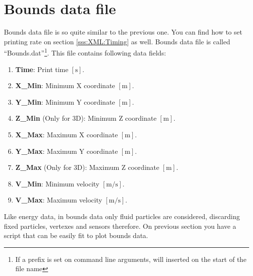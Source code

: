\section{Bounds data file}
\label{ss:running:boundsoutput}
%
Bounds data file is so quite similar to the previous one. You can find how to set
printing rate on section \ref{sss:XML:Timing} as well. Bounds data file is called
``Bounds.dat''\footnote{If a prefix is set on command line arguments, will inserted
on the start of the file name}.\rc
%
This file contains following data fields:
%
\begin{enumerate}
	\item \textbf{Time}: Print time $[\mbox{s}]$.
	\item \textbf{X\_Min}: Minimum X coordinate $[\mbox{m}]$.
	\item \textbf{Y\_Min}: Minimum Y coordinate $[\mbox{m}]$.
	\item \textbf{Z\_Min} (Only for 3D): Minimum Z coordinate $[\mbox{m}]$.
	\item \textbf{X\_Max}: Maximum X coordinate $[\mbox{m}]$.
	\item \textbf{Y\_Max}: Maximum Y coordinate $[\mbox{m}]$.
	\item \textbf{Z\_Max} (Only for 3D): Maximum Z coordinate $[\mbox{m}]$.
	\item \textbf{V\_Min}: Minimum velocity $[\mbox{m/s}]$.
	\item \textbf{V\_Max}: Maximum velocity $[\mbox{m/s}]$.
\end{enumerate}
%
Like energy data, in bounds data only fluid particles are considered, discarding
fixed particles, vertexes and sensors therefore.\rc
%
On previous section you have a script that can be easily fit to plot bounds data.
%

